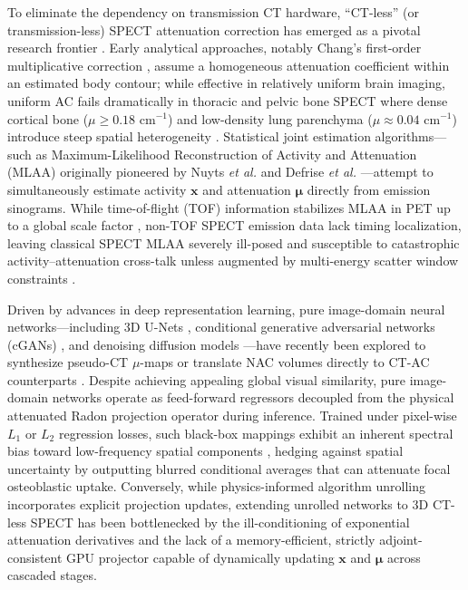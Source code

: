 \documentclass[11pt, a4paper]{article}
\begin{document}
To eliminate the dependency on transmission CT hardware, ``CT-less'' (or transmission-less) SPECT attenuation correction has emerged as a pivotal research frontier \cite{ref8}. Early analytical approaches, notably Chang's first-order multiplicative correction \cite{ref11}, assume a homogeneous attenuation coefficient within an estimated body contour; while effective in relatively uniform brain imaging, uniform AC fails dramatically in thoracic and pelvic bone SPECT where dense cortical bone ($\mu \ge 0.18\text{ cm}^{-1}$) and low-density lung parenchyma ($\mu \approx 0.04\text{ cm}^{-1}$) introduce steep spatial heterogeneity \cite{ref4, ref11}. Statistical joint estimation algorithms---such as Maximum-Likelihood Reconstruction of Activity and Attenuation (MLAA) originally pioneered by Nuyts \textit{et al.} \cite{ref12} and Defrise \textit{et al.} \cite{ref13}---attempt to simultaneously estimate activity $\mathbf{x}$ and attenuation $\boldsymbol{\mu}$ directly from emission sinograms. While time-of-flight (TOF) information stabilizes MLAA in PET up to a global scale factor \cite{ref13, ref14}, non-TOF SPECT emission data lack timing localization, leaving classical SPECT MLAA severely ill-posed and susceptible to catastrophic activity--attenuation cross-talk unless augmented by multi-energy scatter window constraints \cite{ref15, ref16}.

Driven by advances in deep representation learning, pure image-domain neural networks---including 3D U-Nets \cite{ref17, ref18}, conditional generative adversarial networks (cGANs) \cite{ref19, ref20}, and denoising diffusion models \cite{ref21}---have recently been explored to synthesize pseudo-CT $\mu$-maps or translate NAC volumes directly to CT-AC counterparts \cite{ref8, ref22}. Despite achieving appealing global visual similarity, pure image-domain networks operate as feed-forward regressors decoupled from the physical attenuated Radon projection operator during inference. Trained under pixel-wise $L_1$ or $L_2$ regression losses, such black-box mappings exhibit an inherent spectral bias toward low-frequency spatial components \cite{ref23}, hedging against spatial uncertainty by outputting blurred conditional averages that can attenuate focal osteoblastic uptake. Conversely, while physics-informed algorithm unrolling \cite{ref24, ref25, ref26, ref27, ref28} incorporates explicit projection updates, extending unrolled networks to 3D CT-less SPECT has been bottlenecked by the ill-conditioning of exponential attenuation derivatives and the lack of a memory-efficient, strictly adjoint-consistent GPU projector capable of dynamically updating $\mathbf{x}$ and $\boldsymbol{\mu}$ across cascaded stages.
\end{document}
